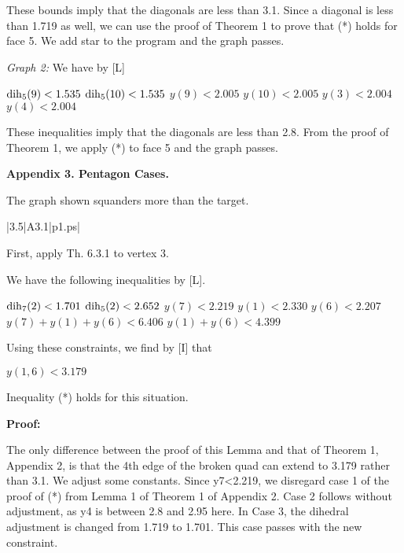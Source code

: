 These bounds imply that the diagonals are less than 3.1.  Since a diagonal is
less than 1.719 as well, we can use the proof of Theorem 1 to prove that (*)
holds for face 5.  We add star to the program and the graph passes.

{\it Graph 2:} We have by [L]

$\operatorname{dih}_5(9) < 1.535$ \newline
$\operatorname{dih}_5(10) < 1.535$ \newline
$y(9) < 2.005$ \newline
$y(10) < 2.005$ \newline
$y(3) < 2.004$ \newline
$y(4) < 2.004$ \newline

These inequalities imply that the diagonals are less than 2.8.  From the proof
of Theorem 1, we apply (*) to face 5 and the graph passes.

 \bigskip



\bigskip

\centerline{{\bf Appendix 3. Pentagon Cases.}}

\bigskip

 The graph shown 
squanders more than the target.  \endproclaim

\gram|3.5|A3.1|p1.ps|  %

First, apply Th. 6.3.1 to vertex 3.

We have the following inequalities by [L].\newline

$\operatorname{dih}_7(2) < 1.701$ \newline
$\operatorname{dih}_5(2) < 2.652$ \newline
$y(7) < 2.219$ \newline
$y(1) < 2.330$ \newline
$y(6) < 2.207$ \newline
$y(7) + y(1) + y(6) < 6.406$ \newline
$y(1) + y(6) < 4.399$ \newline

Using these constraints, we find by [I] that

$y(1,6)<3.179$ \newline

 Inequality (*) holds for this situation. \endproclaim

{\bf Proof:}

The only difference between the proof of this Lemma and that of Theorem 1,
Appendix 2, is that the 4th edge of the broken quad can extend to 3.179 rather
than 3.1.  We adjust some constants.
Since y7<2.219, we disregard case 1 of the proof of (*) from Lemma 1 of
Theorem 1 of Appendix 2.  Case 2 follows without adjustment, as y4 is between
2.8 and 2.95 here.  In Case 3, the dihedral adjustment is changed from 1.719
to 1.701.  This case passes with the new constraint.

